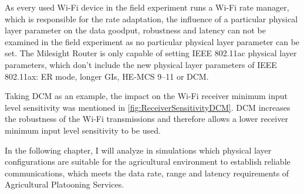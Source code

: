 As every used Wi-Fi device in the field experiment runs a Wi-Fi rate manager, which is responsible for the rate adaptation,
the influence of a particular physical layer parameter on the data goodput, robustness and latency can not be examined in the field experiment as no particular physical layer parameter can be set.
The Milesight Router is only capable of setting IEEE 802.11ac physical layer parameters, which don't include the new physical layer parameters of IEEE 802.11ax:
\ac{ER} mode, longer \ac{GI}s, \ac{HE}-\ac{MCS} \numrange{9}{11} or \ac{DCM}.

Taking \ac{DCM} as an example, the impact on the Wi-Fi receiver minimum input level sensitivity was mentioned in \autoref{fig:ReceiverSensitivityDCM}. \ac{DCM}
increases the robustness of the Wi-Fi transmissions and therefore allows a lower receiver minimum input level sensitivity to be used.

In the following chapter, I will analyze in simulations which physical layer
configurations are suitable for the agricultural environment to establish reliable communications,
which meets the data rate, range and latency requirements of Agricultural Platooning Services.
